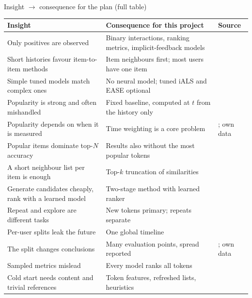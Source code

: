 \documentclass[aspectratio=169,10pt]{beamer}
\newcommand{\toindex}{\hfill\hyperlink{index}{\beamerreturnbutton{index}}}
\begin{document}
\begin{frame}[label=insights]{Insight $\rightarrow$ consequence for the plan (full table) \toindex}
  \scriptsize
  \renewcommand{\arraystretch}{1.0}
  \begin{tabularx}{\textwidth}{@{}>{\raggedright\arraybackslash}X>{\raggedright\arraybackslash}X>{\raggedright\arraybackslash}p{2.9cm}@{}}
    \toprule
    Insight & Consequence for this project & Source \\
    \midrule
    Only positives are observed & Binary interactions, ranking metrics, implicit-feedback models & \cite{hu2008,rendle2009} \\
    Short histories favour item-to-item methods & Item neighbours first; most users have one item & \cite{sarwar2001,hidasi2016,ludewig2018} \\
    Simple tuned models match complex ones & No neural model; tuned iALS and EASE optional & \cite{dacrema2019,rendle2020,rendle2021,anelli2022} \\
    Popularity is strong and often mishandled & Fixed baseline, computed at $t$ from the history only & \cite{li2021,ji2020pop} \\
    Popularity depends on when it is measured & Time weighting is a core problem & \cite{ji2020pop}; own data \\
    Popular items dominate top-$N$ accuracy & Results also without the most popular tokens & \cite{cremonesi2010} \\
    A short neighbour list per item is enough & Top-$k$ truncation of similarities & \cite{sarwar2001} \\
    Generate candidates cheaply, rank with a learned model & Two-stage method with learned ranker & \cite{covington2016,burges2010} \\
    Repeat and explore are different tasks & New tokens primary; repeats separate & \cite{li2021} \\
    Per-user splits leak the future & One global timeline & \cite{ji2020leak} \\
    The split changes conclusions & Many evaluation points, spread reported & \cite{meng2020}; own data \\
    Sampled metrics mislead & Every model ranks all tokens & \cite{krichene2020} \\
    Cold start needs content and trivial references & Token features, refreshed lists, heuristics & \cite{schein2002,choi2024} \\
    \bottomrule
  \end{tabularx}
\end{frame}
\end{document}
